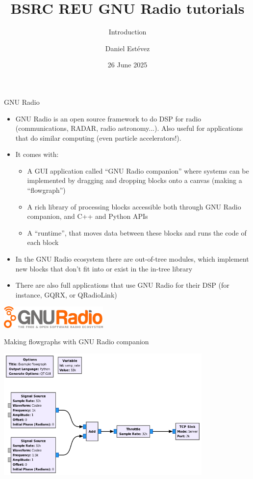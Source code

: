 \documentclass[aspectratio=169]{beamer}
\date{26 June 2025}
\title{BSRC REU GNU Radio tutorials}
\subtitle{Introduction}
\author{Daniel Estévez}
\institute
{}
\begin{document}
\frame{\titlepage}

\begin{frame}{GNU Radio}
  \begin{itemize}
    \item GNU Radio is an open source framework to do DSP for radio
      (communications, RADAR, radio astronomy...). Also useful for applications
      that do similar computing (even particle accelerators!).
    \item It comes with:
      \begin{itemize}
        \item A GUI application called ``GNU Radio companion'' where
             systems can be implemented by dragging and dropping blocks onto a
             canvas (making a ``flowgraph'')
        \item A rich library of processing blocks accessible both through GNU Radio
          companion, and C++ and Python APIs
        \item A ``runtime'', that moves data between these blocks and runs the
          code of each block
      \end{itemize}
    \item In the GNU Radio ecosystem there are out-of-tree modules, which
      implement new blocks that don't fit into or exist in the in-tree library
    \item There are also full applications that use GNU Radio for their DSP (for
      instance, GQRX, or QRadioLink)
  \end{itemize}
  \includegraphics[width=0.4\textwidth]{gnuradio_logo}
\end{frame}

\begin{frame}{Making flowgraphs with GNU Radio companion}
  \begin{center}
    \includegraphics[width=0.8\textwidth]{example_flowgraph}
  \end{center}
\end{frame}
\end{document}
